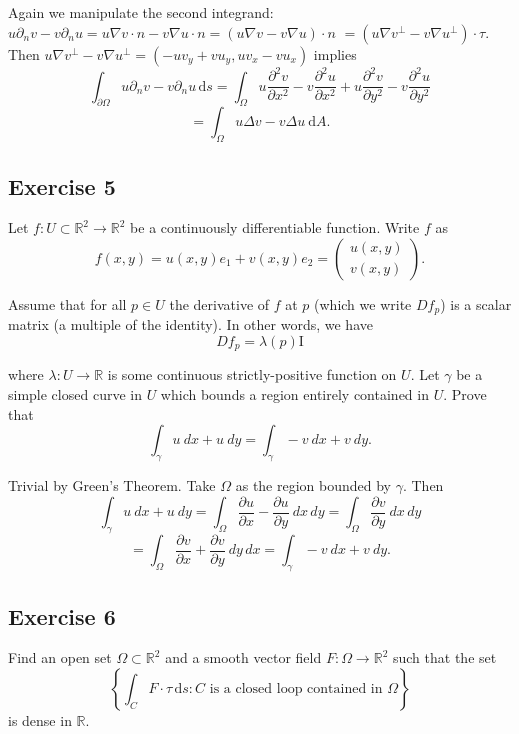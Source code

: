 \documentclass{amsart}
\newcommand{\R}{\mathbb R}
\newcommand{\dd}{\mathrm d}
\begin{document}
\medskip \noindent Again we manipulate the second integrand: $u\partial_nv-v\partial_nu=u\nabla v\cdot n-v\nabla u\cdot n = (u\nabla v - v\nabla u)\cdot n$
$=(u\nabla v^{\perp}-v\nabla u^{\perp})\cdot\tau$. Then $u\nabla v^{\perp}-v\nabla u^{\perp} = (-uv_y+vu_y, uv_x-vu_x)$ implies
\[\int_{\partial \Omega} u \partial_n v - v \partial_n u \, \dd s = 
\int_{\Omega}u\frac{\partial^2v}{\partial x^2}-v\frac{\partial^2u}{\partial x^2}+u\frac{\partial^2v}{\partial y^2}-v\frac{\partial^2u}{\partial y^2}\]
\[=\int_{\Omega}u\Delta v-v\Delta u\: \dd A.\]

\bigskip

\subsection*{Exercise 5} Let $f:U\subset\mathbb{R}^2\rightarrow\mathbb{R}^2$ be a continuously differentiable function. Write $f$ as
\begin{equation*}
f(x,y)=u(x,y)e_1+v(x,y)e_2=\begin{pmatrix}u(x,y) \\ v(x,y)\end{pmatrix}.
\end{equation*}

\noindent Assume that for all $p\in U$ the derivative of $f$ at $p$ (which we write $Df_p$) is a scalar matrix (a multiple of the identity). In other words, we have
\begin{equation*}
Df_p= \lambda(p) \mathrm{I}
\end{equation*}

\noindent where $\lambda:U\rightarrow\mathbb{R}$ is some continuous strictly-positive function on $U$. Let $\gamma$ be a simple closed curve in $U$ which bounds a region entirely contained in $U$. Prove that
\begin{equation*}
\int_\gamma u\:dx+u\:dy=\int_\gamma-v\:dx+v\:dy.
\end{equation*}

\medskip \noindent Trivial by Green's Theorem. Take $\Omega$ as the region bounded by $\gamma$. Then
\[\int_{\gamma} u\: dx+u\:dy=\int_{\Omega}\frac{\partial u}{\partial x}-\frac{\partial u}{\partial y}\:dx\,dy
=\int_{\Omega}\frac{\partial v}{\partial y}\:dx\,dy\]
\[=\int_{\Omega}\frac{\partial v}{\partial x}+\frac{\partial v}{\partial y}\:dy\,dx=\int_{\gamma}-v\:dx+v\:dy.\]

\bigskip

\subsection*{Exercise 6} Find an open set $\Omega \subset \R^2$ and a smooth vector field $F :\Omega \to \R^2$ such that the set
\[ \left\{ \int_{C} F \cdot \tau \, \dd s : C \text{ is a closed loop contained in } \Omega \right\}\]
is dense in $\R$.
\end{document}
